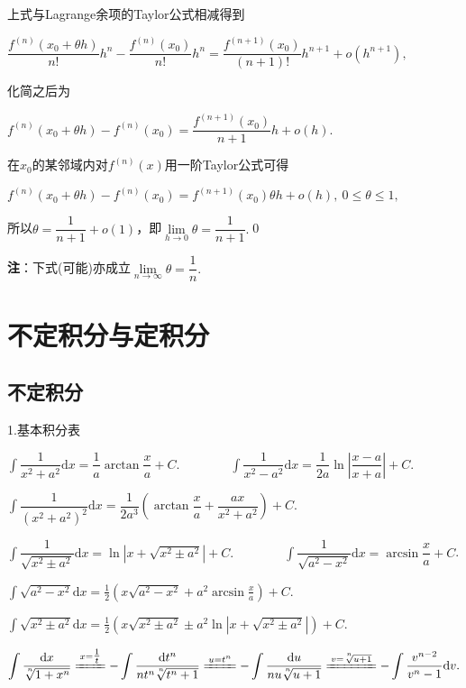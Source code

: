 \documentclass[UTF8]{ctexart}
\numberwithin{equation}{section}
\numberwithin{figure}{section}
\numberwithin{table}{section}
\newcommand\dif{\mathrm{d}}
\newcommand\no{\noindent}
\newcommand\dis{\displaystyle}
\newcommand\ls{\leqslant}
\newcommand\limit{\dis\lim\limits}
\newcommand\intd{\dis\int}
\begin{document}
\begin{spacing}{2}
\vspace{0.2cm}

\no 上式与Lagrange余项的Taylor公式相减得到

\centerline{$\dfrac{f^{(n)}(x_0+\theta h)}{n!}h^{n}-
\dfrac{f^{(n)}(x_0)}{n!}h^{n}
=\dfrac{f^{(n+1)}(x_0)}{(n+1)!}h^{n+1}+o(h^{n+1}),$}

\no 化简之后为

\centerline{$f^{(n)}(x_0+\theta h)-f^{(n)}(x_0)=
\dfrac{f^{(n+1)}(x_0)}{n+1}h+o(h).$}

在$x_0$的某邻域内对$f^{(n)}(x)$用一阶Taylor公式可得

\centerline{$f^{(n)}(x_0+\theta h)-f^{(n)}(x_0)=
f^{(n+1)}(x_0)\theta h+o(h),\ 0\ls\theta\ls1,$}

\no 所以$\theta=\dfrac{1}{n+1}+o(1)$，即$\limit_{h\to0}\theta=\dfrac{1}{n+1}.$\qed

\vspace{0.3cm}

\textbf{注}：下式(可能)亦成立$\limit_{n\to\infty}\theta=\dfrac{1}{n}.$

\newpage

\section{不定积分与定积分}

\subsection{不定积分}

\no1.基本积分表

\begin{spacing}{3}
$\intd\dfrac{1}{x^2+a^2}\dif x=\dfrac{1}{a}\arctan \dfrac{x}{a}+C.
\qquad\qquad
\intd\dfrac{1}{x^2-a^2}\dif x=\dfrac{1}{2a}\ln\left| \dfrac{x-a}{x+a}\right|+C$.

$\intd\dfrac{1}{(x^2+a^2)^2}\dif x=\dfrac{1}{2a^3}\left(\arctan \dfrac{x}{a}
+\dfrac{ax}{x^2+a^2}\right)+C$.

$\intd\dfrac{1}{\sqrt{x^2\pm a^2}}\dif x=\ln \left|x+\sqrt{x^2\pm a^2}\right|+C.
\qquad\qquad
\intd\dfrac{1}{\sqrt{a^2- x^2}}\dif x=\arcsin \dfrac{x}{a}+C$.

$\intd\sqrt{a^2-x^2}\dif x=\frac{1}{2}\left(x\sqrt{a^2-x^2}+a^2
\arcsin\frac{x}{a}\right)+C$.

$\intd\sqrt{x^2\pm a^2}\dif x=\frac{1}{2}\left(x\sqrt{x^2\pm a^2}\pm a^2
\ln\left|x+\sqrt{x^2\pm a^2}\right| \right)+C$.

$\intd\frac{\dif x}{\sqrt[^n\!]{1+x^n}}\xlongequal{x=\tfrac{1}{t}}
-\intd\frac{\dif t^n}{nt^n\sqrt[^n\!]{t^n+1}}\xlongequal{u=t^n}
-\intd\frac{\dif u}{nu\sqrt[^n\!]{u+1}}\xlongequal{v=\sqrt[^n\!]{u+1}}
-\intd\frac{v^{n-2}}{v^n-1}\dif v.$


\end{spacing}
\end{spacing}
\end{document}

